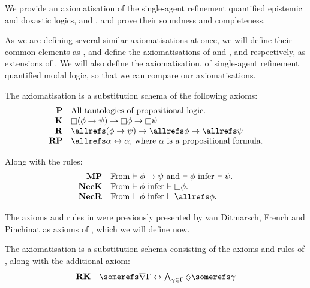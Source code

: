 We provide an axiomatisation of the single-agent refinement quantified epistemic
and doxastic logics, \logicSiF{} and \logicKDiF{}, and prove their soundness
and completeness.

As we are defining several similar axiomatisations at once, we will define their
common elements as \axiomFi{}, and define the axiomatisations of \logicKDiF{}
and \logicSiF{}, \axiomKDiF{} and \axiomSiF{} respectively, as extensions of
\axiomFi{}. We will also define the axiomatisation, \axiomKiF{} of single-agent
refinement quantified modal logic, so that we can compare our axiomatisations.

\begin{definition}
The axiomatisation \axiomFi{} is a substitution schema of the following axioms:
$$
\begin{array}{rl}
{\bf P} & \text{All tautologies of propositional logic.}\\
{\bf K} & \knows (\phi \implies \psi) \implies \knows \phi \implies \knows \psi\\
{\bf R} & \allrefs (\phi \implies \psi) \implies \allrefs \phi \implies \allrefs \psi\\
{\bf RP} & \allrefs \alpha \iff \alpha \text{, where $\alpha$ is a propositional formula.}\\
\end{array}
$$

Along with the rules:
$$
\begin{array}{rl}
{\bf MP} & \text{From $\proves \phi \implies \psi$ and $\proves \phi$ infer
$\proves \psi$.}\\
{\bf NecK} & \text{From $\proves \phi$ infer $\proves \knows \phi$.}\\
{\bf NecR} & \text{From $\proves \phi$ infer $\proves \allrefs \phi$.}
\end{array}
$$
\end{definition}

The axioms and rules in \axiomFi{} were previously presented by van Ditmarsch,
French and Pinchinat as axioms of \axiomKiF{}, which we will define now.

\begin{definition}
The axiomatisation \axiomKiF{} is a substitution schema consisting of the axioms and rules of \axiomFi{}, along with the additional axiom:
$$
\begin{array}{rl}
{\bf RK} & \somerefs \covers \Gamma \iff \bigwedge_{\gamma \in
\Gamma} \suspects \somerefs \gamma
\end{array}
$$
\end{definition}

